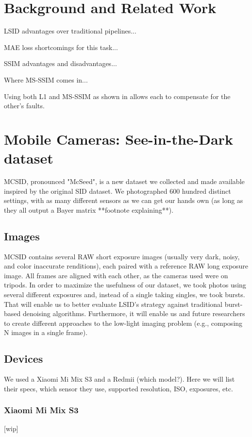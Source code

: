 \chapter{Background and Related Work}

LSID advantages over traditional pipelines...

MAE loss shortcomings for this task...

SSIM advantages and disadvantages...

Where MS-SSIM comes in...

Using both L1 and MS-SSIM as shown in \cite{DBLP:conf/miccai/RonnebergerFB15} allows each to compensate for the other's faults.


\chapter{Mobile Cameras: See-in-the-Dark dataset}
MCSID, pronounced "McSeed", is a new dataset we collected and made available inspired by the original SID dataset.
We photographed 600 hundred distinct settings, with as many different sensors as we can get our hands own (as long as they all output a Bayer matrix **footnote explaining**).

\section{Images}
MCSID contains several RAW short exposure images (usually very dark, noisy, and color inaccurate renditions), each paired with a reference RAW long exposure image.
All frames are aligned with each other, as the cameras used were on tripods.
In order to maximize the usefulness of our dataset, we took photos using several different exposures and, instead of a single taking singles, we took bursts.
That will enable us to better evaluate LSID's strategy against traditional burst-based denoising algorithms.
Furthermore, it will enable us and future researchers to create different approaches to the low-light imaging problem (e.g., composing N images in a single frame).

\section{Devices}
We used a Xiaomi Mi Mix S3 and a Redmii (which model?).
Here we will list their specs, which sensor they use, supported resolution, ISO, exposures, etc.

\subsection{Xiaomi Mi Mix S3}
[wip]

